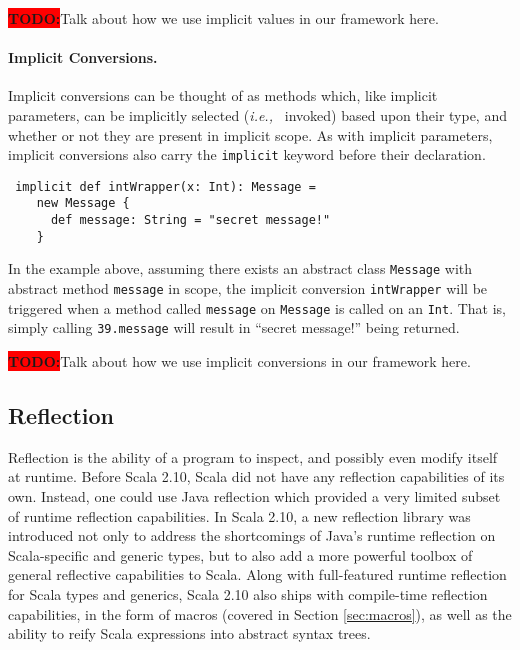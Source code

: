 \documentclass[preprint,10pt]{sigplanconf}
\theoremstyle{definition}
\newcommand{\todo}{{\bf \colorbox{red}{\color{white}TODO:}}}
\newcommand{\ie}{{\em i.e.,~}}
\newcommand{\term}[1]{\mbox{\texttt{#1}}}
\begin{document}
\todo Talk about how we use implicit values in our framework here.

\paragraph{Implicit Conversions.} Implicit conversions can be thought of as
methods which, like implicit parameters, can be implicitly selected (\ie
invoked) based upon their type, and whether or not they are present in
implicit scope. As with implicit parameters, implicit conversions also carry
the \term{implicit} keyword before their declaration.

\begin{lstlisting}
 implicit def intWrapper(x: Int): Message =
    new Message {
      def message: String = "secret message!"
    }
\end{lstlisting}

In the example above, assuming there exists an abstract class \term{Message}
with abstract method \term{message} in scope, the implicit conversion
\term{intWrapper} will be triggered when a method called \term{message} on
\term{Message} is called on an \term{Int}. That is, simply calling
\term{39.message} will result in ``secret message!'' being returned.

\todo Talk about how we use implicit conversions in our framework here.


\subsection{Reflection}

Reflection is the ability of a program to inspect, and possibly even modify
itself at runtime. Before Scala 2.10, Scala did not have any reflection
capabilities of its own. Instead, one could use Java reflection which provided
a very limited subset of runtime reflection capabilities. In Scala 2.10, a new
reflection library was introduced not only to address the shortcomings of
Java's runtime reflection on Scala-specific and generic types, but to also add
a more powerful toolbox of general reflective capabilities to Scala. Along
with full-featured runtime reflection for Scala types and generics, Scala 2.10
also ships with compile-time reflection capabilities, in the form of macros
(covered in Section \ref{sec:macros}), as well as the ability to reify Scala
expressions into abstract syntax trees.
\end{document}
